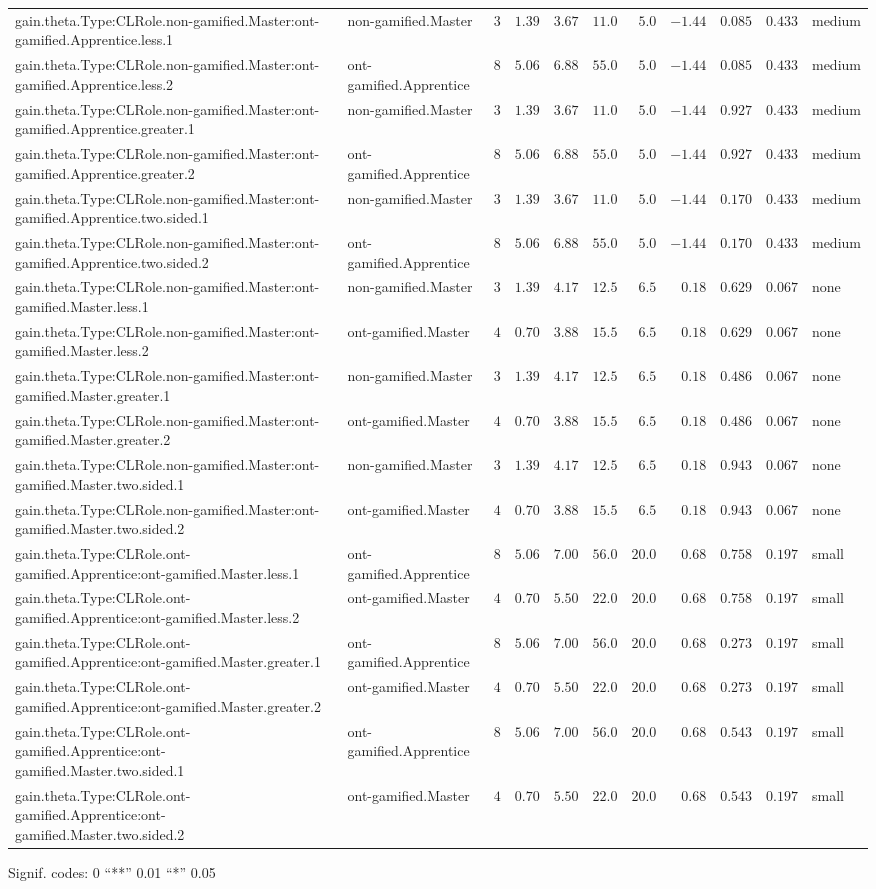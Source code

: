 \documentclass[6pt]{article}
\begin{document}
\begin{landscape}
{\begin{longtable}{llrrrrrrrrl}
gain.theta.Type:CLRole.non-gamified.Master:ont-gamified.Apprentice.less.1&non-gamified.Master&$ 3$&$1.39$&$ 3.67$&$ 11.0$&$ 5.0$&$-1.44$&$0.085$&$0.433$&medium\tabularnewline
gain.theta.Type:CLRole.non-gamified.Master:ont-gamified.Apprentice.less.2&ont-gamified.Apprentice&$ 8$&$5.06$&$ 6.88$&$ 55.0$&$ 5.0$&$-1.44$&$0.085$&$0.433$&medium\tabularnewline
gain.theta.Type:CLRole.non-gamified.Master:ont-gamified.Apprentice.greater.1&non-gamified.Master&$ 3$&$1.39$&$ 3.67$&$ 11.0$&$ 5.0$&$-1.44$&$0.927$&$0.433$&medium\tabularnewline
gain.theta.Type:CLRole.non-gamified.Master:ont-gamified.Apprentice.greater.2&ont-gamified.Apprentice&$ 8$&$5.06$&$ 6.88$&$ 55.0$&$ 5.0$&$-1.44$&$0.927$&$0.433$&medium\tabularnewline
gain.theta.Type:CLRole.non-gamified.Master:ont-gamified.Apprentice.two.sided.1&non-gamified.Master&$ 3$&$1.39$&$ 3.67$&$ 11.0$&$ 5.0$&$-1.44$&$0.170$&$0.433$&medium\tabularnewline
gain.theta.Type:CLRole.non-gamified.Master:ont-gamified.Apprentice.two.sided.2&ont-gamified.Apprentice&$ 8$&$5.06$&$ 6.88$&$ 55.0$&$ 5.0$&$-1.44$&$0.170$&$0.433$&medium\tabularnewline
gain.theta.Type:CLRole.non-gamified.Master:ont-gamified.Master.less.1&non-gamified.Master&$ 3$&$1.39$&$ 4.17$&$ 12.5$&$ 6.5$&$ 0.18$&$0.629$&$0.067$&none\tabularnewline
gain.theta.Type:CLRole.non-gamified.Master:ont-gamified.Master.less.2&ont-gamified.Master&$ 4$&$0.70$&$ 3.88$&$ 15.5$&$ 6.5$&$ 0.18$&$0.629$&$0.067$&none\tabularnewline
gain.theta.Type:CLRole.non-gamified.Master:ont-gamified.Master.greater.1&non-gamified.Master&$ 3$&$1.39$&$ 4.17$&$ 12.5$&$ 6.5$&$ 0.18$&$0.486$&$0.067$&none\tabularnewline
gain.theta.Type:CLRole.non-gamified.Master:ont-gamified.Master.greater.2&ont-gamified.Master&$ 4$&$0.70$&$ 3.88$&$ 15.5$&$ 6.5$&$ 0.18$&$0.486$&$0.067$&none\tabularnewline
gain.theta.Type:CLRole.non-gamified.Master:ont-gamified.Master.two.sided.1&non-gamified.Master&$ 3$&$1.39$&$ 4.17$&$ 12.5$&$ 6.5$&$ 0.18$&$0.943$&$0.067$&none\tabularnewline
gain.theta.Type:CLRole.non-gamified.Master:ont-gamified.Master.two.sided.2&ont-gamified.Master&$ 4$&$0.70$&$ 3.88$&$ 15.5$&$ 6.5$&$ 0.18$&$0.943$&$0.067$&none\tabularnewline
gain.theta.Type:CLRole.ont-gamified.Apprentice:ont-gamified.Master.less.1&ont-gamified.Apprentice&$ 8$&$5.06$&$ 7.00$&$ 56.0$&$20.0$&$ 0.68$&$0.758$&$0.197$&small\tabularnewline
gain.theta.Type:CLRole.ont-gamified.Apprentice:ont-gamified.Master.less.2&ont-gamified.Master&$ 4$&$0.70$&$ 5.50$&$ 22.0$&$20.0$&$ 0.68$&$0.758$&$0.197$&small\tabularnewline
gain.theta.Type:CLRole.ont-gamified.Apprentice:ont-gamified.Master.greater.1&ont-gamified.Apprentice&$ 8$&$5.06$&$ 7.00$&$ 56.0$&$20.0$&$ 0.68$&$0.273$&$0.197$&small\tabularnewline
gain.theta.Type:CLRole.ont-gamified.Apprentice:ont-gamified.Master.greater.2&ont-gamified.Master&$ 4$&$0.70$&$ 5.50$&$ 22.0$&$20.0$&$ 0.68$&$0.273$&$0.197$&small\tabularnewline
\newpage
gain.theta.Type:CLRole.ont-gamified.Apprentice:ont-gamified.Master.two.sided.1&ont-gamified.Apprentice&$ 8$&$5.06$&$ 7.00$&$ 56.0$&$20.0$&$ 0.68$&$0.543$&$0.197$&small\tabularnewline
gain.theta.Type:CLRole.ont-gamified.Apprentice:ont-gamified.Master.two.sided.2&ont-gamified.Master&$ 4$&$0.70$&$ 5.50$&$ 22.0$&$20.0$&$ 0.68$&$0.543$&$0.197$&small\tabularnewline
\hline
\end{longtable}}\end{landscape}
\begin{flushright}{ \tiny{ Signif. codes:  0 ``**'' 0.01 ``*'' 0.05 }}\end{flushright} 
\end{document}
